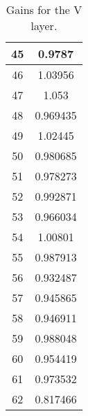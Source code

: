 \begin{table}[h]
\begin{subtable}[h]{2in}
{\begin{tabular}{|c|c|}
45	&	0.9787	\\	\hline
46	&	1.03956	\\	\hline
47	&	1.053	\\	\hline
48	&	0.969435	\\	\hline
49	&	1.02445	\\	\hline
50	&	0.980685	\\	\hline
51	&	0.978273	\\	\hline
52	&	0.992871	\\	\hline
53	&	0.966034	\\	\hline
54	&	1.00801	\\	\hline
55	&	0.987913	\\	\hline
56	&	0.932487	\\	\hline
57	&	0.945865	\\	\hline
58	&	0.946911	\\	\hline
59	&	0.988048	\\	\hline
60	&	0.954419	\\	\hline
61	&	0.973532	\\	\hline
62	&	0.817466	\\	\hline
        \end{tabular}
        }
        \caption{Gains for the V layer.}
    \end{subtable}
    \quad
    \begin{subtable}[h]{2in}
        \centering{}
\end{subtable}
\end{table}
